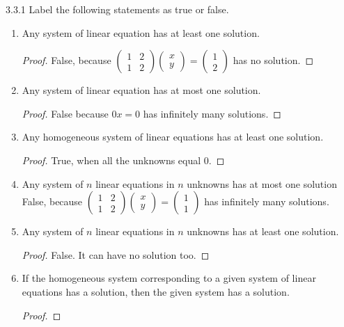 \documentclass[12pt, a4paper]{article}
\theoremstyle{plain}
\begin{document}
\begin{exercise}{3.3.1}
Label the following statements as true or false.
\begin{enumerate}[label=(\alph*)]
\item Any system of linear equation has at least one solution.
	\begin{proof}
	False, because $\begin{pmatrix}
	1&2\\
	1&2
	\end{pmatrix}
	\begin{pmatrix}
	x\\
	y
	\end{pmatrix}=
	\begin{pmatrix}
	1\\
	2
	\end{pmatrix}$ has no solution.
	\end{proof}
\item Any system of linear equation has at most one solution.
	\begin{proof}
	False because $0x=0$ has infinitely many solutions.
	\end{proof}
\item Any homogeneous system of linear equations has at least one solution.
	\begin{proof}
	True, when all the unknowns equal $0$.
	\end{proof}
\item Any system of $n$ linear equations in $n$ unknowns has at most one solution
	False, because $\begin{pmatrix}
	1&2\\
	1&2
	\end{pmatrix}
	\begin{pmatrix}
	x\\
	y
	\end{pmatrix}=
	\begin{pmatrix}
	1\\
	1
	\end{pmatrix}$ has infinitely many solutions.
\item Any system of $n$ linear equations in $n$ unknowns has at least one solution.
	\begin{proof}
	False. It can have no solution too.
	\end{proof}
\item If the homogeneous system corresponding to a given system of linear equations has a solution, then the given system has a solution.
	\begin{proof}

\end{proof}
\end{enumerate}
\end{exercise}
\end{document}
